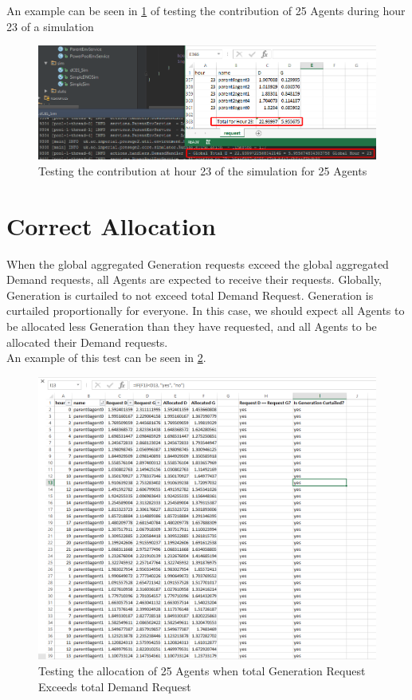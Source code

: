 An example can be seen in \ref{fig:test1} of testing the contribution of 25 Agents during hour 23 of a simulation

\begin{figure}[h!]
	\centering
	\includegraphics[scale=0.4]{Images/test-contribution.png}
	\caption{Testing the contribution at hour 23 of the simulation for 25 Agents}
	\label{fig:test1}
\end{figure}

\section*{Correct Allocation}
When the global aggregated Generation requests exceed the global aggregated Demand requests, all Agents are expected to receive their requests. Globally, Generation is curtailed to not exceed total Demand Request. Generation is curtailed proportionally for everyone. In this case, we should expect all Agents to be allocated less Generation than they have requested, and all Agents to be allocated their Demand requests. \\

An example of this test can be seen in \ref{fig:test2}. \\

\begin{figure}[h!]
	\centering
	\includegraphics[scale=0.4]{Images/test-allocation1.png}
	\caption{Testing the allocation of 25 Agents when total Generation Request Exceeds total Demand Request}
	\label{fig:test2}
\end{figure}

